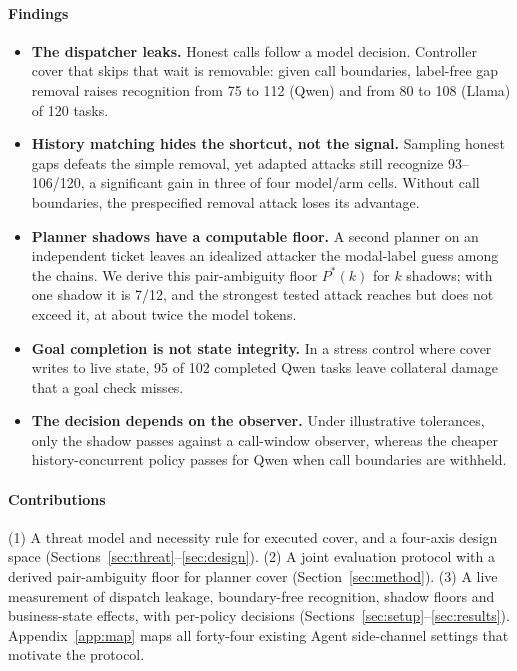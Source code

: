 \paragraph{Findings}
\begin{itemize}
\item \textbf{The dispatcher leaks.} Honest calls follow a model decision. Controller cover that skips that wait is removable: given call boundaries, label-free gap removal raises recognition from 75 to 112 (Qwen) and from 80 to 108 (Llama) of 120 tasks.
\item \textbf{History matching hides the shortcut, not the signal.} Sampling honest gaps defeats the simple removal, yet adapted attacks still recognize 93--106/120, a significant gain in three of four model/arm cells. Without call boundaries, the prespecified removal attack loses its advantage.
\item \textbf{Planner shadows have a computable floor.} A second planner on an independent ticket leaves an idealized attacker the modal-label guess among the chains. We derive this pair-ambiguity floor $P^*(k)$ for $k$ shadows; with one shadow it is 7/12, and the strongest tested attack reaches but does not exceed it, at about twice the model tokens.
\item \textbf{Goal completion is not state integrity.} In a stress control where cover writes to live state, 95 of 102 completed Qwen tasks leave collateral damage that a goal check misses.
\item \textbf{The decision depends on the observer.} Under illustrative tolerances, only the shadow passes against a call-window observer, whereas the cheaper history-concurrent policy passes for Qwen when call boundaries are withheld.
\end{itemize}

\paragraph{Contributions}
(1) A threat model and necessity rule for executed cover, and a four-axis design space (Sections~\ref{sec:threat}--\ref{sec:design}). (2) A joint evaluation protocol with a derived pair-ambiguity floor for planner cover (Section~\ref{sec:method}). (3) A live measurement of dispatch leakage, boundary-free recognition, shadow floors and business-state effects, with per-policy decisions (Sections~\ref{sec:setup}--\ref{sec:results}). Appendix~\ref{app:map} maps all forty-four existing Agent side-channel settings that motivate the protocol.
